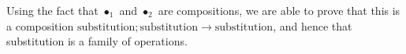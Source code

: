 Using the fact that $\bullet_1$ and $\bullet_2$ are compositions, we are
able to prove that this is a composition $\mathrm{substitution} ; \mathrm{substitution} \rightarrow \mathrm{substitution}$, and hence that substitution is a family of operations.

\begin{code}%
\> \AgdaSymbol{:}  \AgdaSymbol{\{}\AgdaSymbol{\}} \AgdaSymbol{\{}\AgdaSymbol{\}} \AgdaSymbol{\{}\AgdaSymbol{\}} \AgdaSymbol{\{} \AgdaSymbol{:}   \AgdaSymbol{\}} \AgdaSymbol{\{} \AgdaSymbol{:}   \AgdaSymbol{\}} \AgdaSymbol{\{}\AgdaSymbol{\}}  \<[63]%
\>[63]\<%
\\
\>[0]\<[2]%
\>[2]  \AgdaSymbol{(}  \AgdaSymbol{)}        \<%
\end{code}

